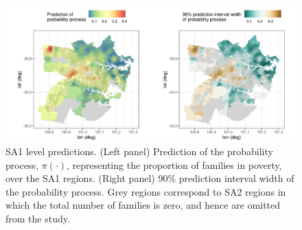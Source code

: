 \documentclass[12pt,a4paper]{article}
\begin{document}
\begin{figure}[t!]
    \centering
    \includegraphics[width = \linewidth]{Images/Sydney_SA1_predictions.png}
    \caption{SA1 level predictions. (Left panel) Prediction of the probability process, $\pi(\cdot)$, representing the proportion of families in poverty, over the SA1 regions. (Right panel) 90\% prediction interval width of the probability process.
    Grey regions correspond to SA2 regions in which the total number of families is zero, and hence are omitted from the study. 
}   
  \label{fig:SA1_predictions}
\end{figure}
\end{document}
